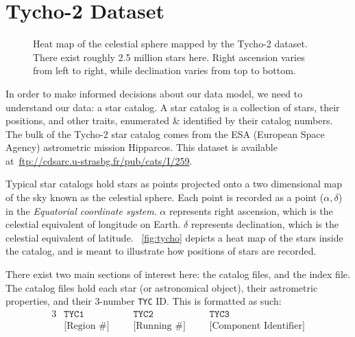 \section{Tycho-2 Dataset}\label{sec:tycho-2Dataset}
\begin{figure}
    \caption{Heat map of the celestial sphere mapped by the Tycho-2 dataset.
    There exist roughly 2.5 million stars here.
    Right ascension varies from left to right, while declination varies from top to bottom.}\label{fig:tycho}
\end{figure}

In order to make informed decisions about our data model, we need to understand our data: a star catalog.
A star catalog is a collection of stars, their positions, and other traits, enumerated \& identified by their catalog
numbers.
The bulk of the Tycho-2 star catalog comes from the ESA (European Space Agency) astrometric mission Hipparcos.
This dataset is available at~\url{ftp://cdsarc.u-strasbg.fr/pub/cats/I/259}.

Typical star catalogs hold stars as points projected onto a two dimensional map of the sky known as the celestial
sphere.
Each point is recorded as a point ($\alpha, \delta$) in the \textit{Equatorial coordinate system}.
$\alpha$ represents right ascension, which is the celestial equivalent of longitude on Earth.
$\delta$ represents declination, which is the celestial equivalent of latitude.
~\autoref{fig:tycho} depicts a heat map of the stars inside the catalog, and is meant to illustrate how positions of
stars are recorded.

There exist two main sections of interest here: the catalog files, and the index file.
The catalog files hold each star (or astronomical object), their astrometric properties, and their 3-number \texttt{TYC}
ID\@.
This is formatted as such:
\begin{alignat*}{3}
    &\texttt{TYC1} &&\texttt{TYC2} &&\texttt{TYC3} \\
    &\text{[Region \#]} \ \ \ \ &&\text{[Running \#]} \ \ \ \ &&\text{[Component Identifier]}
\end{alignat*}

